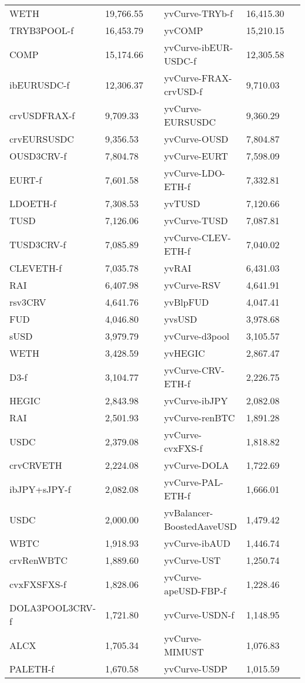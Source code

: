 \begin{longtable}{@{}p{0.25\linewidth}p{0.25\linewidth}p{0.25\linewidth}p{0.25\linewidth}@{}}
WETH & 19,766.55 & yvCurve-TRYb-f &16,415.30 \\
TRYB3POOL-f & 16,453.79 & yvCOMP &15,210.15 \\
COMP & 15,174.66 & yvCurve-ibEUR-USDC-f &12,305.58 \\
ibEURUSDC-f & 12,306.37 & yvCurve-FRAX-crvUSD-f &9,710.03 \\
crvUSDFRAX-f & 9,709.33 & yvCurve-EURSUSDC &9,360.29 \\
crvEURSUSDC & 9,356.53 & yvCurve-OUSD &7,804.87 \\
OUSD3CRV-f & 7,804.78 & yvCurve-EURT &7,598.09 \\
EURT-f & 7,601.58 & yvCurve-LDO-ETH-f &7,332.81 \\
LDOETH-f & 7,308.53 & yvTUSD &7,120.66 \\
TUSD & 7,126.06 & yvCurve-TUSD &7,087.81 \\
TUSD3CRV-f & 7,085.89 & yvCurve-CLEV-ETH-f &7,040.02 \\
CLEVETH-f & 7,035.78 & yvRAI &6,431.03 \\
RAI & 6,407.98 & yvCurve-RSV &4,641.91 \\
rsv3CRV & 4,641.76 & yvBlpFUD &4,047.41 \\
FUD & 4,046.80 & yvsUSD &3,978.68 \\
sUSD & 3,979.79 & yvCurve-d3pool &3,105.57 \\
WETH & 3,428.59 & yvHEGIC &2,867.47 \\
D3-f & 3,104.77 & yvCurve-CRV-ETH-f &2,226.75 \\
HEGIC & 2,843.98 & yvCurve-ibJPY &2,082.08 \\
RAI & 2,501.93 & yvCurve-renBTC &1,891.28 \\
USDC & 2,379.08 & yvCurve-cvxFXS-f &1,818.82 \\
crvCRVETH & 2,224.08 & yvCurve-DOLA &1,722.69 \\
ibJPY+sJPY-f & 2,082.08 & yvCurve-PAL-ETH-f &1,666.01 \\
USDC & 2,000.00 & yvBalancer-BoostedAaveUSD &1,479.42 \\
WBTC & 1,918.93 & yvCurve-ibAUD &1,446.74 \\
crvRenWBTC & 1,889.60 & yvCurve-UST &1,250.74 \\
cvxFXSFXS-f & 1,828.06 & yvCurve-apeUSD-FBP-f &1,228.46 \\
DOLA3POOL3CRV-f & 1,721.80 & yvCurve-USDN-f &1,148.95 \\
ALCX & 1,705.34 & yvCurve-MIMUST &1,076.83 \\
PALETH-f & 1,670.58 & yvCurve-USDP &1,015.59 \\

\end{longtable}
